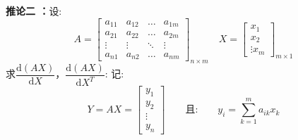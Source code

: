 \documentclass[withoutpreface,bwprint]{cumcmthesis} %
\begin{document}
	\textbf{推论二 ：}设:
	\begin{equation}
		A=\left[
		\begin{array}{cccc}
			a_{11}&a_{12}&\ldots&a_{1m}\\
			a_{21}&a_{22}&\ldots&a_{2m}\\
			\vdots&\vdots&\ddots&\vdots\\
			a_{n1}&a_{n2}&\ldots&a_{nm}
		\end{array}
		\right]_{n{\times}m} \quad X=\left[
		\begin{array}{c}
			x_1\\
			x_2\\
			\vdots
			x_m
		\end{array}
		\right]_{m{\times}1}
	\end{equation}
	求$\dfrac{\mathrm{d } (AX)}{\mathrm{d} X}$，$\dfrac{\mathrm{d } (AX)}{\mathrm{d} X^T}$:
	记:
	\begin{equation*}
		Y=AX=\left[
			\begin{array}{c}
				y_1\\
				y_2\\
				\vdots\\
				y_n
			\end{array}
		\right]  \quad\quad\text{且:}\quad\quad y_i=\sum_{k=1}^{m}a_{ik}x_k
	\end{equation*}
\end{document}
